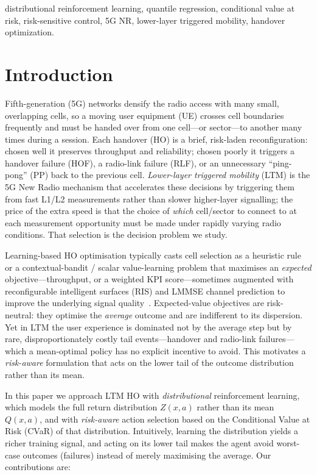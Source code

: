 \documentclass[conference]{IEEEtran}
\begin{document}
\begin{IEEEkeywords}
distributional reinforcement learning, quantile regression, conditional value
at risk, risk-sensitive control, 5G NR, lower-layer triggered mobility,
handover optimization.
\end{IEEEkeywords}

\section{Introduction}

Fifth-generation (5G) networks densify the radio access with many small,
overlapping cells, so a moving user equipment (UE) crosses cell boundaries
frequently and must be handed over from one cell---or sector---to another many
times during a session. Each handover (HO) is a brief, risk-laden
reconfiguration: chosen well it preserves throughput and reliability; chosen
poorly it triggers a handover failure (HOF), a radio-link failure (RLF), or an
unnecessary ``ping-pong'' (PP) back to the previous cell. \emph{Lower-layer
triggered mobility} (LTM) is the 5G New Radio mechanism that accelerates these
decisions by triggering them from fast L1/L2 measurements rather than slower
higher-layer signalling; the price of the extra speed is that the choice of
\emph{which} cell/sector to connect to at each measurement opportunity must be
made under rapidly varying radio conditions. That selection is the decision
problem we study.

Learning-based HO optimisation typically casts cell selection as a heuristic
rule or a contextual-bandit / scalar value-learning problem that maximises an
\emph{expected} objective---throughput, or a weighted KPI score---sometimes
augmented with reconfigurable intelligent surfaces (RIS) and LMMSE channel
prediction to improve the underlying signal quality~\cite{cmab_ho}. Expected-value
objectives are risk-neutral: they optimise the \emph{average} outcome and are
indifferent to its dispersion. Yet in LTM the user experience is dominated not
by the average step but by rare, disproportionately costly tail
events---handover and radio-link failures---which a mean-optimal policy has no
explicit incentive to avoid. This motivates a \emph{risk-aware} formulation
that acts on the lower tail of the outcome distribution rather than its mean.

In this paper we approach LTM HO with \emph{distributional} reinforcement
learning, which models the full return distribution $Z(x,a)$ rather than its
mean $Q(x,a)$, and with \emph{risk-aware} action selection based on the
Conditional Value at Risk (CVaR) of that distribution. Intuitively, learning
the distribution yields a richer training signal, and acting on its lower tail
makes the agent avoid worst-case outcomes (failures) instead of merely
maximising the average. Our contributions are:
\end{document}
